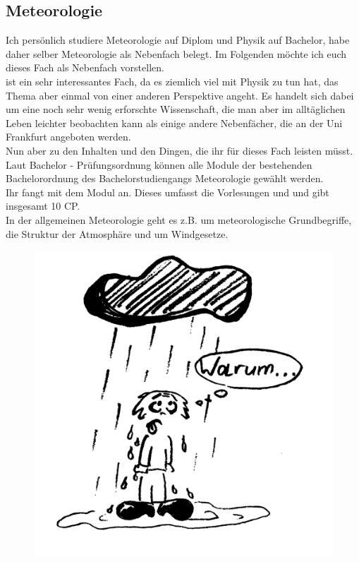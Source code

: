 \subsection{Meteorologie}

Ich persönlich studiere Meteorologie auf Diplom und Physik auf Bachelor, habe daher selber Meteorologie als Nebenfach belegt. 
Im Folgenden möchte ich euch dieses Fach als Nebenfach vorstellen.\\
 ist ein sehr interessantes Fach, da es ziemlich viel mit Physik zu tun hat, das Thema aber einmal von einer anderen Perspektive angeht.
Es handelt sich dabei um eine noch sehr wenig erforschte Wissenschaft, die man aber im alltäglichen Leben leichter beobachten kann als einige andere Nebenfächer, die an der
Uni Frankfurt angeboten werden.\\
Nun aber zu den Inhalten und den Dingen, die ihr für dieses Fach leisten müsst.\\
Laut Bachelor - Prüfungsordnung können alle Module der bestehenden Bachelorordnung des Bachelorstudiengangs Meteorologie gewählt werden.\\
Ihr fangt mit dem Modul  an.
Dieses umfasst die Vorlesungen  und  und gibt insgesamt 10 CP.\\
In der allgemeinen Meteorologie geht es z.B. um meteorologische Grundbegriffe, die Struktur der Atmosphäre und um Windgesetze. 
\begin{figure}[!t]
  \begin{center}
  \includegraphics[width=.7\textwidth]{bilder/meteorologe.jpg}
\end{center}
\end{figure}

